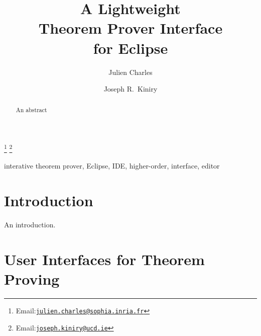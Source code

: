 \documentclass{entcs}
\begin{document}
\begin{frontmatter}

\title{A Lightweight\\Theorem Prover Interface\\for Eclipse}

\author{Julien Charles}

\address{Everest Group\\
  INRIA Sophia Antipolis\\
  2004 Route des Lucioles - BP 93\\
  FR-06902 Sophia Antipolis, France}

\author{Joseph R.~Kiniry}

\address{Systems Research Group\\
  School of Computer Science and Informatics\\
  University College Dublin\\
  Belfield, Dublin 4, Ireland}

\thanks[charles]{Email:\href{mailto:julien.charles@sophia.inria.fr}
  {\texttt{\normalshape julien.charles@sophia.inria.fr}}}
\thanks[kiniry]{Email:\href{mailto:joseph.kiniry@ucd.ie}
  {\texttt{\normalshape joseph.kiniry@ucd.ie}}}

\thispagestyle{empty}
\begin{abstract}

  An abstract  

\end{abstract}
\begin{keyword}
 interative theorem prover, Eclipse, IDE, higher-order, interface, editor
\end{keyword}

\end{frontmatter}

\section{Introduction}
\label{sec:introduction}

An introduction.

\section{User Interfaces for Theorem Proving}
\label{sec:user-interf-theor}
\end{document}
